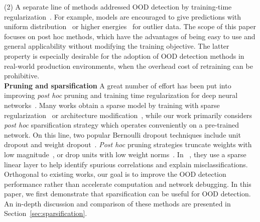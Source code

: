 \documentclass[runningheads]{llncs}
\begin{document}
(2) A separate line of methods addressed OOD detection by training-time regularization~\cite{bevandic2018discriminative,chen2021atom,geifman2019selectivenet,hein2019relu,hendrycks2018deep,jeong2020ood,katzsamuels2022training,lee2017training,liu2020energy,malinin2018predictive,meinke2019towards,ming2022posterior,mohseni2020self,van2020uncertainty,hongxin2022logitnorm,yang2021semantic}.
For example, models are encouraged to give predictions with uniform distribution~\cite{hendrycks2018deep,lee2017training} or higher energies~\cite{du2022unknown,du2022vos,katzsamuels2022training,liu2020energy,ming2022posterior} for outlier data. The scope of this paper focuses on post hoc methods, which have the advantages of being easy to use and general applicability without modifying the training objective. The latter property is especially desirable for the adoption of OOD detection methods in real-world production environments, when the overhead cost of retraining can be  prohibitive. \\

\noindent \textbf{Pruning and sparsification} 
A great number of effort has been put into improving \emph{post hoc} pruning and training time regularization for deep neural networks~\cite{adadrop2013neurips,Mohammad2016NoiseOut,targetDropout,Han2016deepcomp,Han2015prune,Hao2017pruneUnit,Christos2018l0prune}. Many works obtain a sparse model by training with sparse regularization~\cite{adadrop2013neurips,Mohammad2016NoiseOut,Han2016deepcomp,Christos2018l0prune,sun2019dka} or architecture modification~\cite{targetDropout,Hao2017pruneUnit}, while our work primarily considers \emph{post hoc} sparsification strategy which
operates conveniently on a {pre-trained} network. On this line, two popular Bernoulli dropout techniques include unit dropout and weight dropout~\cite{Nitish2014dropout}. 
\emph{Post hoc} pruning strategies truncate weights with low magnitude~\cite{Han2015prune}, or drop units with low weight norms~\cite{Hao2017pruneUnit}.  In ~\cite{wong2021leveraging}, they use a sparse linear layer to help identify spurious correlations and explain misclassifications. 
Orthogonal to existing works, our goal is to improve the OOD detection performance rather than accelerate computation and network debugging. In this paper, we first demonstrate that sparsification can be useful for OOD detection.
An in-depth discussion and comparison of these methods are presented in Section~\ref{sec:sparsification}. \\
\end{document}
